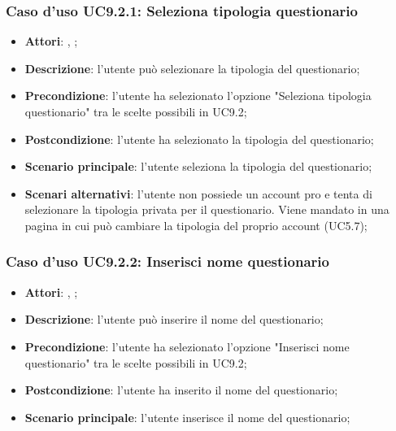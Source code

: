 		\subsubsection{Caso d'uso UC9.2.1: Seleziona tipologia questionario}
		\label{UC9.2.1}
		\begin{itemize}
			\item \textbf{Attori}: \uau, \uaupro;
			\item \textbf{Descrizione}: l'utente può selezionare la tipologia del questionario; 
			\item \textbf{Precondizione}: l'utente ha selezionato l'opzione "Seleziona tipologia questionario" tra le scelte possibili in UC9.2;
			\item \textbf{Postcondizione}: l'utente ha selezionato la tipologia del questionario;
			\item \textbf{Scenario principale}: l'utente seleziona la tipologia del questionario;
			\item \textbf{Scenari alternativi}: l'utente non possiede un account pro e tenta di selezionare la tipologia privata per il questionario. Viene mandato in una pagina in cui può cambiare la tipologia del proprio account (UC5.7); 
		\end{itemize}
			
		\subsubsection{Caso d'uso UC9.2.2: Inserisci nome questionario}
		\label{UC9.2.2}
		\begin{itemize}
			\item \textbf{Attori}: \uau, \uaupro;
			\item \textbf{Descrizione}: l'utente può inserire il nome del questionario; 
			\item \textbf{Precondizione}: l'utente ha selezionato l'opzione "Inserisci nome questionario" tra le scelte possibili in UC9.2;
			\item \textbf{Postcondizione}: l'utente ha inserito il nome del questionario; 
			\item \textbf{Scenario principale}: l'utente inserisce il nome del questionario;
		\end{itemize}
		
